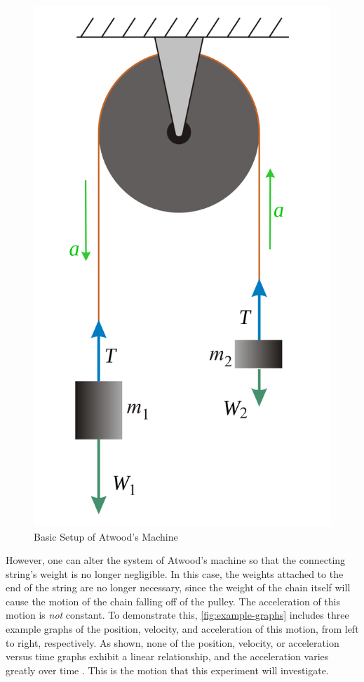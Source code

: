 \documentclass[stu,biblatex,floatsintext,draftall]{apa7}
\begin{document}
\begin{figure}[H]
	\centering
	\caption{Basic Setup of Atwood's Machine}
	\label{fig:atwoods-machine}
	\includegraphics[height=0.25\paperheight]{atwoods-machine-fbd}
\end{figure}

However, one can alter the system of Atwood's machine so that the connecting string's weight is no longer negligible. In this case, the weights attached to the end of the string are no longer necessary, since the weight of the chain itself will cause the motion of the chain falling off of the pulley. The acceleration of this motion is \emph{not} constant. To demonstrate this, \autoref{fig:example-graphs} includes three example graphs of the position, velocity, and acceleration of this motion, from left to right, respectively. As shown, none of the position, velocity, or acceleration versus time graphs exhibit a linear relationship, and the acceleration varies greatly over time \parencite{Hilsdorf2023AtwoodsHeavyChainHandout}. This is the motion that this experiment will investigate.
\end{document}
